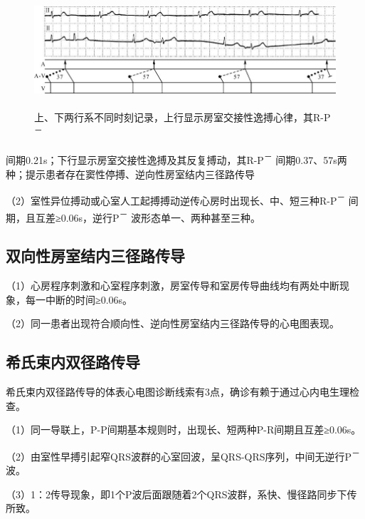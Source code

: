 \begin{figure}[!htbp]
 \centering
 \includegraphics[width=5.79167in,height=1.67708in]{./images/Image00437.jpg}
 \captionsetup{justification=centering}
 \caption{上、下两行系不同时刻记录，上行显示房室交接性逸搏心律，其R-P\textsuperscript{－}}
 \label{fig25-19}
  \end{figure} 
间期0.21s；下行显示房室交接性逸搏及其反复搏动，其R-P\textsuperscript{－}
间期0.37、57s两种；提示患者存在窦性停搏、逆向性房室结内三径路传导

（2）室性异位搏动或心室人工起搏搏动逆传心房时出现长、中、短三种R-P\textsuperscript{－}
间期，且互差≥0.06s，逆行P\textsuperscript{－} 波形态单一、两种甚至三种。

\protect\hypertarget{text00032.htmlux5cux23subid387}{}{}

\subsection{双向性房室结内三径路传导}

（1）心房程序刺激和心室程序刺激，房室传导和室房传导曲线均有两处中断现象，每一中断的时间≥0.06s。

（2）同一患者出现符合顺向性、逆向性房室结内三径路传导的心电图表现。

\protect\hypertarget{text00032.htmlux5cux23subid388}{}{}

\subsection{希氏束内双径路传导}

希氏束内双径路传导的体表心电图诊断线索有3点，确诊有赖于通过心内电生理检查。

（1）同一导联上，P-P间期基本规则时，出现长、短两种P-R间期且互差≥0.06s。

（2）由室性早搏引起窄QRS波群的心室回波，呈QRS-QRS序列，中间无逆行P\textsuperscript{－}
波。

（3）1：2传导现象，即1个P波后面跟随着2个QRS波群，系快、慢径路同步下传所致。

\protect\hypertarget{text00032.htmlux5cux23subid389}{}{}

